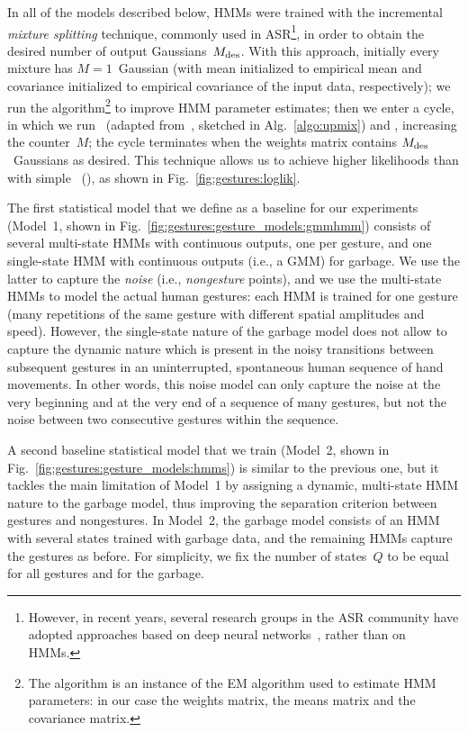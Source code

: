 In all of the models described below, \acp{HMM} were trained with the incremental \emph{mixture splitting} technique, commonly used in \ac{ASR}\footnote{%
However, in recent years, several research groups in the \ac{ASR} community have adopted approaches based on deep neural networks~\cite{hinton:2012:dnn_asr}, rather than on \acp{HMM}.%
}, in order to obtain the desired number of output Gaussians~$M_{\text{des}}$.
With this approach,
initially every mixture has $M=1$~Gaussian (with mean initialized to empirical mean and covariance initialized to empirical covariance of the input data, respectively);
we run the \BW{} algorithm\footnote{The \BW{} algorithm is an instance of the \ac{EM} algorithm used to estimate \ac{HMM} parameters: in our case the weights matrix, the means matrix and the covariance matrix.} to improve \ac{HMM} parameter estimates;
then we enter a cycle, in which we run \UpMix\, (adapted from~\cite[Sec.~10.6]{young:htkbook}, sketched in Alg.~\ref{algo:upmix}) and \BW, increasing the counter~$M$;
the cycle terminates when the weights matrix contains $M_{\text{des}}$~Gaussians as desired. This technique allows us to achieve higher likelihoods than with simple \BW~(\EM), as shown in Fig.~\ref{fig:gestures:loglik}.

The first statistical model that we define as a baseline for our experiments (Model~1, shown in Fig.~\ref{fig:gestures:gesture_models:gmmhmm}) consists of several multi-state \acp{HMM} with continuous outputs, one per gesture, and one single-state \ac{HMM} with continuous outputs (i.e., a \ac{GMM}) for garbage.
We use the latter to capture the \emph{noise} (i.e., \emph{nongesture} points), and we use the multi-state \acp{HMM} to model the actual human gestures: each \ac{HMM} is trained for one gesture (many repetitions of the same gesture with different spatial amplitudes and speed).
However, the single-state nature of the garbage model does not allow to capture the dynamic nature which is present in the noisy transitions between subsequent gestures in an uninterrupted, spontaneous human sequence of hand movements.
In other words, this noise model can only capture the noise at the very beginning and at the very end of a sequence of many gestures, but not the noise between two consecutive gestures within the sequence.

A second baseline statistical model that we train (Model~2, shown in Fig.~\ref{fig:gestures:gesture_models:hmms}) is similar to the previous one, but it tackles the main limitation of Model~1 by assigning a dynamic, multi-state \ac{HMM} nature to the garbage model, thus improving the separation criterion between gestures and nongestures.
In Model~2, the garbage model consists of an \ac{HMM} with several states trained with garbage data, and the remaining \acp{HMM} capture the gestures as before.
For simplicity, we fix the number of states~$Q$ to be equal for all gestures and for the garbage.

